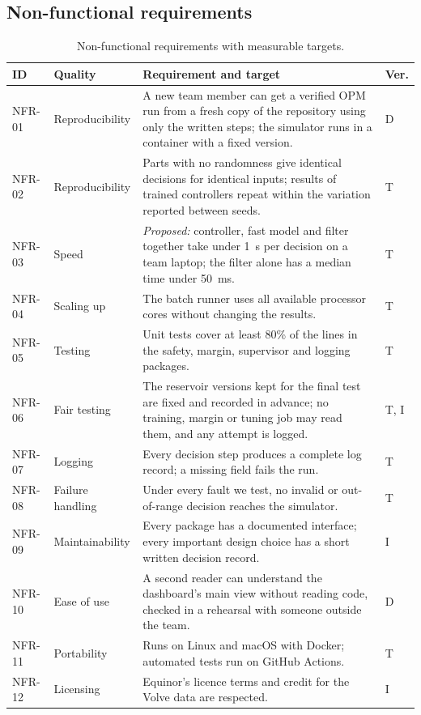 \documentclass[11pt,letterpaper]{article}
\begin{document}
\subsection{Non-functional requirements}

\begin{table}[H]
\caption{Non-functional requirements with measurable targets.}\label{tab:nfr}
\small
\begin{tabularx}{\textwidth}{@{}P{1.35cm}P{2.3cm}LP{0.7cm}@{}}
\toprule
\textbf{ID} & \textbf{Quality} & \textbf{Requirement and target} & \textbf{Ver.} \\
\midrule
NFR-01 & Reproducibility & A new team member can get a verified OPM run from a fresh copy of the repository using only the written steps; the simulator runs in a container with a fixed version. & D \\
NFR-02 & Reproducibility & Parts with no randomness give identical decisions for identical inputs; results of trained controllers repeat within the variation reported between seeds. & T \\
NFR-03 & Speed & \emph{Proposed:} controller, fast model and filter together take under \SI{1}{\second} per decision on a team laptop; the filter alone has a median time under \SI{50}{\milli\second}. & T \\
NFR-04 & Scaling up & The batch runner uses all available processor cores without changing the results. & T \\
NFR-05 & Testing & Unit tests cover at least 80\% of the lines in the safety, margin, supervisor and logging packages. & T \\
NFR-06 & Fair testing & The reservoir versions kept for the final test are fixed and recorded in advance; no training, margin or tuning job may read them, and any attempt is logged. & T, I \\
NFR-07 & Logging & Every decision step produces a complete log record; a missing field fails the run. & T \\
NFR-08 & Failure handling & Under every fault we test, no invalid or out-of-range decision reaches the simulator. & T \\
NFR-09 & Maintainability & Every package has a documented interface; every important design choice has a short written decision record. & I \\
NFR-10 & Ease of use & A second reader can understand the dashboard's main view without reading code, checked in a rehearsal with someone outside the team. & D \\
NFR-11 & Portability & Runs on Linux and macOS with Docker; automated tests run on GitHub Actions. & T \\
NFR-12 & Licensing & Equinor's licence terms and credit for the Volve data are respected. & I \\
\bottomrule
\end{tabularx}
\end{table}
\end{document}
